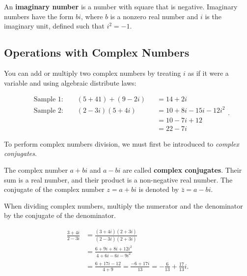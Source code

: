 \begin{definition}
  \label{def:imaginary_number}

  An \textbf{imaginary number} is a number with square that is negative.
  Imaginary numbers have the form $bi$, where $b$ is a nonzero real number and
  $i$ is the imaginary unit, defined such that $i^{2} = -1$.
\end{definition}

\subsection{Operations with Complex Numbers}
\label{sub_sec:operations_with_complex_numbers}

You can add or multiply two complex numbers by treating $i$ as if it were a
variable and using algebraic distribute laws:

\begin{equation*}
  \begin{alignedat}{3}
   &\textrm{Sample $1$:} \qquad (5 + 41) + (9 - 2i) &&= 14 + 2i \\
   &\textrm{Sample $2$:} \qquad (2 - 3i)(5 + 4i) &&= 10 + 8i - 15i - 12i^{2} \\
   &                             &&= 10 - 7i + 12 \\
   &                             &&= 22 - 7i
  \end{alignedat}
.\end{equation*}

To perform complex numbers division, we must first be introduced to
\textit{complex conjugates}.

\begin{definition}
  \label{def:complex_conjugtes}

  The complex number $a + bi$ and $a - bi$ are called \textbf{complex
  conjugates}. Their sum is a real number, and their product is a non-negative
  real number. The conjugate of the complex number $z = a + bi$ is denoted by
  $\bar{z} = a - bi$.
\end{definition}

\begin{note}
  When dividing complex numbers, multiply the numerator and the denominator by
  the conjugate of the denominator.
\end{note}

\begin{align*}
  \frac{3 + 4i}{2 - 3i} &= \frac{(3 + 4i)(2 + 3i)}{(2 - 3i)(2 + 3i)} \\
                        &= \frac{6 + 9i + 8i + 12i^{2}}{4 + 6i - 6i - 9i^{2}} \\
                        &= \frac{6 + 17i - 12}{4 + 9} = \frac{-6 + 17i}{13} = -\frac{6}{13} + \frac{17}{13}i
.\end{align*}




\newpage

